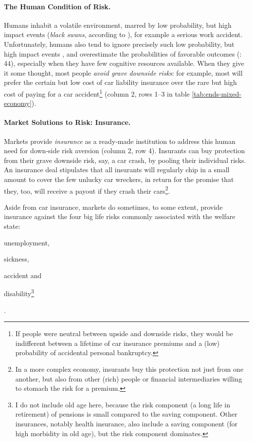 
\paragraph{The Human Condition of Risk.}  \label{sec:human-condition-of-risk} Humans inhabit a volatile environment, marred by low probability, but high impact events (\emph{black swans}, according to \citealt{Taleb2007}), for example a serious work accident. Unfortunately, humans also tend to ignore precisely such low probability, but high impact events \citep{Taleb2007}, and overestimate the probabilities of favorable outcomes (\citealt{Baron2000}: 44), especially when they have few cognitive resources available. 
When they give it some thought, most people \emph{avoid grave downside risks}: for example, most will prefer the certain but low cost of car liability insurance over the rare but high cost of paying for a car accident\footnote{
	If people were neutral between upside and downside risks, they would be indifferent between a lifetime of car insurance premiums and a (low) probability of accidental personal bankruptcy.} %
(column 2, rows 1--3 in table \ref{tab:ends-mixed-economy}).

\paragraph{Market Solutions to Risk: Insurance.}  \label{sec:insurance} Markets provide \emph{insurance} as a ready-made institution to address this human need for down-side risk aversion (column 2, row 4). Insurants can buy protection from their grave downside risk, say, a car crash, by pooling their individual risks. An insurance deal stipulates that all insurants will regularly chip in a small amount to cover the few unlucky car wreckers, in return for the promise that they, too, will receive a payout if they crash their cars\footnote{
	In a more complex economy, insurants buy this protection not just from one another, but also from other (rich) people or financial intermediaries willing to stomach the risk for a premium.}. 

Aside from car insurance, markets do sometimes, to some extent, provide insurance against the four big life risks commonly associated with the welfare state: \begin{inparaenum}[1)] 
	\item unemployment, 
	\item sickness, 
	\item accident and 
	\item disability\footnote{
	I do not include old age here, because the risk component (a long life in retirement) of pensions is small compared to the saving component. Other insurances, notably health insurance, also include a saving component (for high morbidity in old age), but the risk component dominates.}\end{inparaenum}.
	
